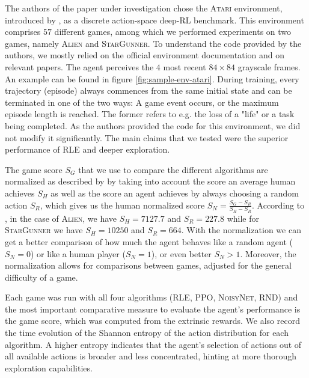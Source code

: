 \documentclass[10pt]{article} %
\begin{document}
The authors of the paper under investigation chose the \textsc{Atari} environment, introduced by \cite{atari-introduction}, as a discrete action-space deep-RL benchmark. This environment comprises $57$ different games, among which we performed experiments on two games, namely \textsc{Alien} and \textsc{StarGunner}. To understand the code provided by the authors, we mostly relied on the official environment documentation and on relevant papers. The agent perceives the $4$ most recent $84\times84$ grayscale frames. An example can be found in figure \ref{fig:sample-env-atari}. During training, every trajectory (episode) always commences from the same initial state and can be terminated in one of the two ways: A game event occurs, or the maximum episode length is reached. The former refers to e.g. the loss of a "life" or a task being completed. As the authors provided the code for this environment, we did not modify it significantly. The main claims that we tested were the superior performance of \textsc{RLE} and deeper exploration.

\noindent The game score $S_{G}$ that we use to compare the different algorithms are normalized as described by \cite{agent57} by taking into account the score an average human achieves $S_{H}$ as well as the score an agent achieves by always choosing a random action $S_{R}$, which gives us the human normalized score $S_{N} = \frac{S_{G} - S_{R}}{S_{H} - S_{R}}$. According to \cite{agent57}, in the case of \textsc{Alien}, we have $S_{H} = 7127.7$ and $S_{R} = 227.8$ while for \textsc{StarGunner} we have $S_{H} = 10250$ and $S_{R} = 664$. With the normalization we can get a better comparison of how much the agent behaves like a random agent ($S_{N} = 0$) or like a human player ($S_{N} = 1$), or even better $S_{N} > 1$. Moreover, the normalization allows for comparisons between games, adjusted for the general difficulty of a game.

\noindent Each game was run with all four algorithms (\textsc{RLE}, \textsc{PPO}, \textsc{NoisyNet}, \textsc{RND}) and the most important comparative measure to evaluate the agent's performance is the game score, which was computed from the extrinsic rewards. We also record the time evolution of the Shannon entropy of the action distribution for each algorithm. A higher entropy indicates that the agent's selection of actions out of all available actions is broader and less concentrated, hinting at more thorough exploration capabilities.
\end{document}

